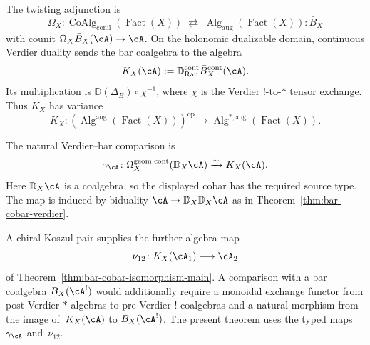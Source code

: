 \begin{remark}\label{rem:verdier-engine}
The twisting adjunction is
\[
\Omega_X \colon
\operatorname{CoAlg}_{\mathrm{conil}}(\operatorname{Fact}(X))
\;\rightleftarrows\;
\operatorname{Alg}_{\mathrm{aug}}(\operatorname{Fact}(X))
 :\!\bar{B}_X
\]
with counit $\Omega_X\bar B_X(\cA)\to\cA$.  On the holonomic
dualizable domain, continuous Verdier duality sends the bar coalgebra
to the algebra
\[
K_X(\cA):=
\mathbb{D}_{\operatorname{Ran}}^{\mathrm{cont}}
\bar{B}_X^{\mathrm{cont}}(\cA).
\]
Its multiplication is
$\mathbb D(\Delta_B)\circ\chi^{-1}$, where $\chi$ is the Verdier
$!$-to-$*$ tensor exchange.  Thus $K_X$ has variance
\[
K_X\colon
(\operatorname{Alg}^{\mathrm{aug}}(\operatorname{Fact}(X)))^{\mathrm{op}}
\longrightarrow
\operatorname{Alg}^{*,\mathrm{aug}}(\operatorname{Fact}(X)).
\]

The natural Verdier--bar comparison is
\[
\gamma_\cA\colon
\Omega_X^{\mathrm{geom,cont}}(\mathbb D_X\cA)
\xrightarrow{\sim}K_X(\cA).
\]
Here $\mathbb D_X\cA$ is a coalgebra, so the displayed cobar has the
required source type.  The map is induced by biduality
$\cA\to\mathbb D_X\mathbb D_X\cA$ as in
Theorem~\ref{thm:bar-cobar-verdier}.

A chiral Koszul pair supplies the further algebra map
\[
\nu_{12}\colon K_X(\cA_1)\longrightarrow\cA_2
\]
of Theorem~\ref{thm:bar-cobar-isomorphism-main}.  A comparison with a
bar coalgebra $B_X(\cA^!)$ would additionally require a monoidal
exchange functor from post-Verdier $*$-algebras to pre-Verdier
$!$-coalgebras and a natural morphism from the image of~$K_X(\cA)$ to
$B_X(\cA^!)$.  The present theorem uses the typed maps~$\gamma_\cA$
and~$\nu_{12}$.
\end{remark}

